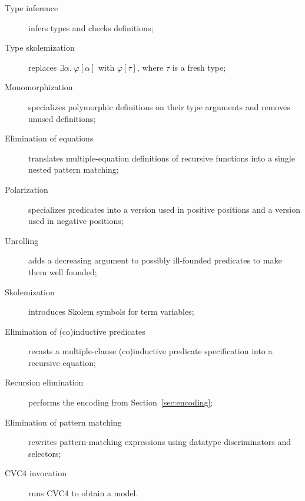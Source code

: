 \begin{description}
  \item[Type inference] infers types and checks definitions;
  \item[Type skolemization]
    replaces $\exists \alpha.\; \varphi[\alpha]$
      with $\varphi[\tau]$, where $\tau$ is a fresh type;
  \item[Monomorphization]
    specializes polymorphic definitions on their type arguments and removes
    unused definitions;
  \item[Elimination of equations]
    translates multiple-equation definitions of recursive functions into
      a single nested pattern matching;
  \item[Polarization]
    specializes predicates into a version used in positive positions
      and a version used in negative positions;
  \item[Unrolling]
    adds a decreasing argument to possibly ill-founded predicates to make
    them well founded;
  \item[Skolemization]
    introduces Skolem symbols for term variables;
  \item[Elimination of (co)inductive predicates]
    recasts a multiple-clause (co)inductive predicate specification
      into a recursive equation;
  \item[Recursion elimination]
    performs the encoding from Section~\ref{sec:encoding};
  \item[Elimination of pattern matching]
    rewrites pattern-matching expressions using datatype
    discriminators and selectors;
  \item[CVC4 invocation] runs CVC4 to obtain a model.
\end{description}

%
%
%
%
%

